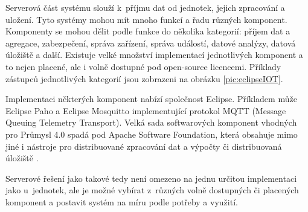 Serverová část systému slouží k~příjmu dat od jednotek, jejich zpracování a uložení. Tyto systémy mohou mít mnoho funkcí a řadu různých komponent. Komponenty se mohou dělit podle funkce do několika kategorií: příjem dat a agregace, zabezpečení, správa zařízení, správa událostí, datové analýzy, datová úložiště a další. Existuje velké množství implementací jednotlivých komponent a to nejen placené, ale i volně dostupné pod open-source licencemi. Příklady zástupců jednotlivých kategorií jsou zobrazeni na obrázku \ref{pic:eclipseIOT}.

Implementaci některých komponent nabízí společnost Eclipse. Příkladem může Eclipse Paho a Eclipse Mosquitto implementující protokol MQTT  (Message Queuing Telemetry Transport). Velká sada softwarových komponent vhodných pro Průmysl 4.0 spadá pod Apache Software Foundation, která obsahuje mimo jiné i nástroje pro distribuované zpracování dat a výpočty či distribuovaná úložiště \cite{eclipse}.

Serverové řešení jako takové tedy není omezeno na jednu určitou implementaci jako u~jednotek, ale je možné vybírat z~různých volně dostupných či placených komponent a postavit systém na míru podle potřeby a využití.




